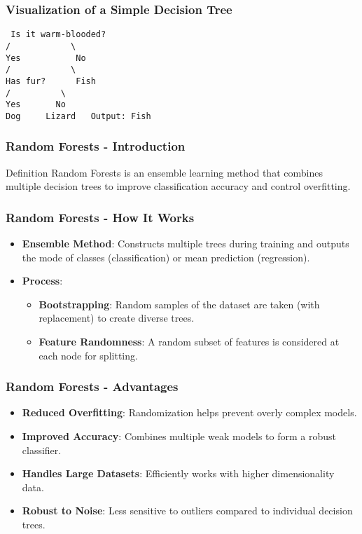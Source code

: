 \documentclass[aspectratio=169]{beamer}
\begin{document}
\begin{frame}[fragile]
    \frametitle{Visualization of a Simple Decision Tree}
    \begin{center}
        \texttt{
            Is it warm-blooded? \\
            / \ \ \ \ \ \ \ \ \ \ \  \backslash \\
            Yes \ \ \ \ \ \ \ \ \ \  No \\
            / \ \ \ \ \ \ \ \ \ \ \  \backslash \\
            Has fur? \ \ \ \ \  Fish \\
            / \ \ \ \ \ \ \ \ \  \backslash \\
            Yes \ \ \ \ \ \  No \\
            Dog \ \ \ \  Lizard \ \  Output: Fish
        }
    \end{center}
\end{frame}

\begin{frame}[fragile]
    \frametitle{Random Forests - Introduction}
    \begin{block}{Definition}
        Random Forests is an ensemble learning method that combines multiple decision trees to improve classification accuracy and control overfitting.
    \end{block}
\end{frame}

\begin{frame}[fragile]
    \frametitle{Random Forests - How It Works}
    \begin{itemize}
        \item \textbf{Ensemble Method}: Constructs multiple trees during training and outputs the mode of classes (classification) or mean prediction (regression).
        \item \textbf{Process}:
        \begin{itemize}
            \item \textbf{Bootstrapping}: Random samples of the dataset are taken (with replacement) to create diverse trees.
            \item \textbf{Feature Randomness}: A random subset of features is considered at each node for splitting.
        \end{itemize}
    \end{itemize}
\end{frame}

\begin{frame}[fragile]
    \frametitle{Random Forests - Advantages}
    \begin{itemize}
        \item \textbf{Reduced Overfitting}: Randomization helps prevent overly complex models.
        \item \textbf{Improved Accuracy}: Combines multiple weak models to form a robust classifier.
        \item \textbf{Handles Large Datasets}: Efficiently works with higher dimensionality data.
        \item \textbf{Robust to Noise}: Less sensitive to outliers compared to individual decision trees.
    \end{itemize}
\end{frame}
\end{document}
